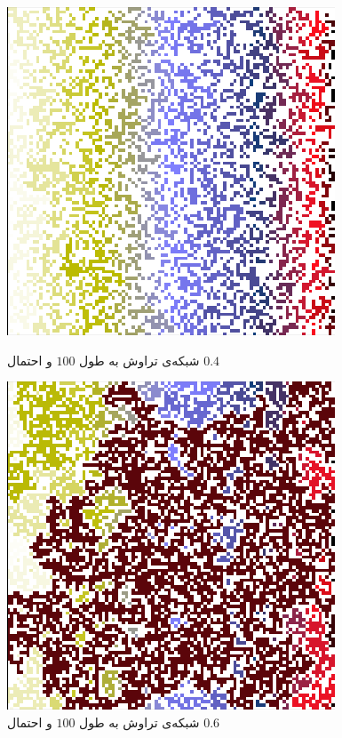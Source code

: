 \documentclass[11pt, a4paper]{article}
\begin{document}
\begin{figure}[h]
	\centering
  \begin{minipage}[b]{0.48\textwidth}
    \includegraphics[width=\textwidth]{q2_100_0.4.png}
    \caption{شبکه‌ی تراوش به طول $100$ و احتمال $0.4$}
    \label{fig:q2_100_.4}
  \end{minipage}
  \hfill
  \begin{minipage}[b]{0.48\textwidth}
    \includegraphics[width=\textwidth]{q2_100_0.6.png}
    \caption{شبکه‌ی تراوش به طول $100$ و احتمال $0.6$}
    \label{fig:q2_100_.6}
  \end{minipage}
\end{figure}
\end{document}
